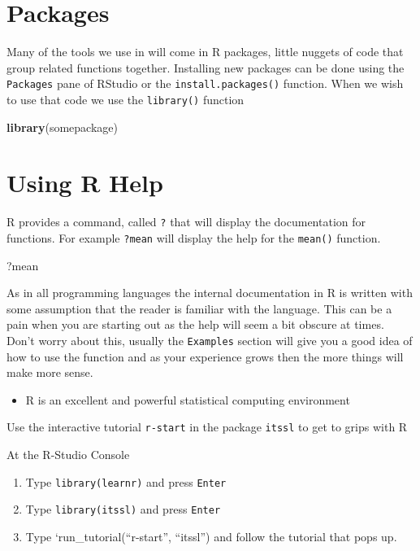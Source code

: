 \documentclass[
]{book}
\newenvironment{Shaded}{\begin{snugshade}}{\end{snugshade}}
\newcommand{\KeywordTok}[1]{\textcolor[rgb]{0.13,0.29,0.53}{\textbf{#1}}}
\newcommand{\NormalTok}[1]{#1}
\providecommand{\tightlist}{%
  \setlength{\itemsep}{0pt}\setlength{\parskip}{0pt}}
\newenvironment{task}
{ \begin{tcolorbox}[title=For you to do,title filled] }
{  \end{tcolorbox} }
\newenvironment{roundup}
{ \begin{tcolorbox}[colbacktitle=yellow!50!white,
title=Round Up,coltitle=black,
fonttitle=\bfseries] }
{  \end{tcolorbox} }
\begin{document}
\hypertarget{packages}{%
\section{Packages}\label{packages}}

Many of the tools we use in will come in R packages, little nuggets of code that group related functions together. Installing new packages can be done using the \texttt{Packages} pane of RStudio or the \texttt{install.packages()} function. When we wish to use that code we use the \texttt{library()} function

\begin{Shaded}
\begin{Highlighting}[]
\KeywordTok{library}\NormalTok{(somepackage)}
\end{Highlighting}
\end{Shaded}

\hypertarget{using-r-help}{%
\section{Using R Help}\label{using-r-help}}

R provides a command, called \texttt{?} that will display the documentation for functions. For example \texttt{?mean} will display the help for the \texttt{mean()} function.

\begin{Shaded}
\begin{Highlighting}[]
\NormalTok{?mean}
\end{Highlighting}
\end{Shaded}

As in all programming languages the internal documentation in R is written with some assumption that the reader is familiar with the language. This can be a pain when you are starting out as the help will seem a bit obscure at times. Don't worry about this, usually the \texttt{Examples} section will give you a good idea of how to use the function and as your experience grows then the more things will make more sense.

\begin{roundup}
\begin{itemize}
\tightlist
\item
  R is an excellent and powerful statistical computing environment
\end{itemize}
\end{roundup}

\begin{task}
Use the interactive tutorial \texttt{r-start} in the package \texttt{itssl} to get to grips with R

At the R-Studio Console

\begin{enumerate}
\def\labelenumi{\arabic{enumi}.}
\tightlist
\item
  Type \texttt{library(learnr)} and press \texttt{Enter}
\item
  Type \texttt{library(itssl)} and press \texttt{Enter}
\item
  Type `run\_tutorial(``r-start'', ``itssl'') and follow the tutorial that pops up.
\end{enumerate}
\end{task}
\end{document}
